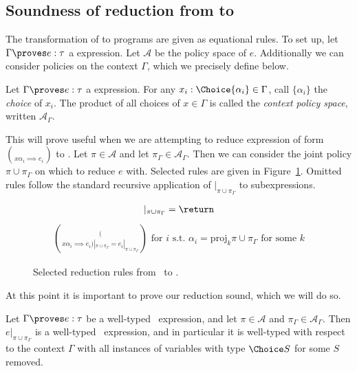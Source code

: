 \subsection{Soundness of reduction from \dappl{} to \util{}}
\label{appendix:reduction soundness}

The transformation of \dappl{} to \util{} programs are given as
equational rules. To set up, let $\Gamma \proves e : \tau$ a \dappl{} 
expression. Let $\mathcal A$ be the policy space of $e$. Additionally we can 
consider policies on the context $\Gamma$, which we precisely define below.

\begin{definition}\label{def:context policy space}
  Let $\Gamma \proves e : \tau$ a \dappl{} expression. 
  For any $x_i : \Choice{\alpha_i} \in \Gamma$, 
  call $\{\alpha_i\}$ the \emph{choice} of $x_i$. 
  The product of all choices of $x \in \Gamma$ is called 
  the \emph{context policy space}, written $\mathcal{A}_{\Gamma}$.
\end{definition}

This will prove useful when we are attempting to reduce expression of form
$\choose x {\alpha_i \implies e_i}$ to \util{}.
Let $\pi \in \mathcal A$ and let $\pi_{\Gamma} \in \mathcal{A}_{\Gamma}$. 
Then we can consider the joint policy $\pi \cup \pi_{\Gamma}$ on which to
reduce $e$ with.
Selected rules are given in Figure~\ref{fig:dappl to util}.
Omitted rules follow the standard recursive application of $|_{\pi \cup \pi_{\Gamma}}$
to subexpressions.

\begin{figure}[H]
  \begin{mdframed}
    \begin{align*}
      [\alpha_1, \cdots, \alpha_n]|_{\pi \cup \pi_{\Gamma}} = \return \tt
    \end{align*}
    \begin{align*}
      {(\choose x {\alpha_i \implies e_i})|_{\pi \cup \pi_{\Gamma}} = e_i|_{\pi \cup \pi_{\Gamma}}}
      \text{ for $i$ s.t. $\alpha_i = \mathrm{proj}_k \pi \cup \pi_{\Gamma}$ for some $k$}
    \end{align*}
  \end{mdframed}
  \caption{Selected reduction rules from \dappl~to \util.}
  \label{fig:dappl to util}
\end{figure}

At this point it is important to prove 
our reduction sound, which we will do so.

\begin{lemma}\label{lemma:dappl to util}
  Let $\Gamma \proves e : \tau$ be a well-typed \dappl~expression, 
  and let $\pi \in \mathcal A$ and $\pi_{\Gamma} \in \mathcal{A}_{\Gamma}.$ 
  Then $e|_{\pi \cup \pi_{\Gamma}}$ is a well-typed \util~expression, and 
  in particular it is well-typed with respect to the context $\Gamma$ with 
  all instances of variables with type $\Choice S$ for some $S$ removed.
\end{lemma}

